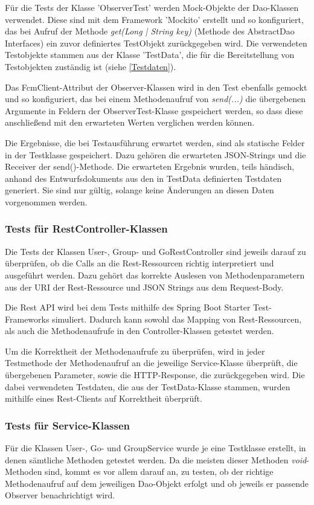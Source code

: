 \documentclass[11pt,a4paper]{scrartcl}
\begin{document}
Für die Tests der Klasse 'ObserverTest' werden Mock-Objekte der Dao-Klassen verwendet. Diese sind mit dem Framework 'Mockito' erstellt und so konfiguriert, das bei Aufruf der Methode \textit{get({Long | String} key)} (Methode des AbstractDao Interfaces) ein zuvor definiertes TestObjekt zurückgegeben wird. Die verwendeten Testobjekte stammen aus der Klasse 'TestData', die für die Bereitstellung von Testobjekten zuständig ist (siehe \ref{Testdaten}).

Das FcmClient-Attribut der Observer-Klassen wird in den Test ebenfalls gemockt und so konfiguriert, das bei einem Methodenaufruf von \textit{send(...)} die übergebenen Argumente in Feldern der ObserverTest-Klasse gespeichert werden, so dass diese anschließend mit den erwarteten Werten verglichen werden können.

Die Ergebnisse, die bei Testausführung erwartet werden, sind als statische Felder in der Testklasse gespeichert. Dazu gehören die erwarteten JSON-Strings und die Receiver der send()-Methode.
Die erwarteten Ergebnis wurden, teils händisch, anhand des Entwurfsdokuments aus den in TestData definierten Testdaten generiert. Sie sind nur gültig, solange keine Änderungen an diesen Daten vorgenommen werden.

\subsubsection{Tests für RestController-Klassen}
Die Tests der Klassen User-, Group- und GoRestController sind jeweils darauf zu überprüfen, ob die Calls an die Rest-Ressourcen richtig interpretiert und ausgeführt werden. Dazu gehört das korrekte Auslesen von Methodenparametern aus der URI der Rest-Ressource und JSON Strings aus dem Request-Body.

Die Rest API wird bei dem Tests mithilfe des Spring Boot Starter Test-Frameworks simuliert. Dadurch kann sowohl das Mapping von Rest-Ressourcen, als auch die Methodenaufrufe in den Controller-Klassen getestet werden.

Um die Korrektheit der Methodenaufrufe zu überprüfen, wird in jeder Testmethode der Methodenaufruf an die jeweilige Service-Klasse überprüft, die übergebenen Parameter, sowie die HTTP-Response, die zurückgegeben wird. Die dabei verwendeten Testdaten, die aus der TestData-Klasse stammen, wurden mithilfe eines Rest-Clients auf Korrektheit überprüft.

\subsubsection{Tests für Service-Klassen}
Für die Klassen User-, Go- und GroupService wurde je eine Testklasse erstellt, in denen sämtliche Methoden getestet werden. Da die meisten dieser Methoden \textit{void}-Methoden sind, kommt es vor allem darauf an, zu testen, ob der richtige Methodenaufruf auf dem jeweiligen Dao-Objekt erfolgt und ob jeweils er passende Observer benachrichtigt wird.
\end{document}
